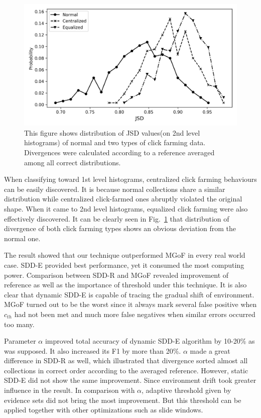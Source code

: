\documentclass{article}
\begin{document}
			\begin{figure}[!t]
				\centering
				\includegraphics[width=\linewidth]{fig/RawOverview2nd.png}
				\caption{This figure shows distribution of JSD values(on 2nd level histograms) of normal and two types of click farming data. Divergences were calculated according to a reference averaged among all correct distributions.}
				\label{fig:raw-overview}
			\end{figure}
	
			When classifying toward 1st level histograms, centralized click farming behaviours can be easily discovered. It is because normal collections share a similar distribution while centralized click-farmed ones abruptly violated the original shape.
			When it came to 2nd level histograms, equalized click farming were also effectively discovered. It can be clearly seen in Fig.~\ref{fig:raw-overview} that distribution of divergence of both click farming types shows an obvious deviation from the normal one.
			
			The result showed that our technique outperformed MGoF in every real world case.
			SDD-E provided best performance, yet it consumed the most computing power. Comparison between SDD-R and MGoF revealed improvement of reference as well as the importance of threshold under this technique. It is also clear that dynamic SDD-E is capable of tracing the gradual shift of environment. MGoF turned out to be the worst since it always mark several false positive when $c_{th}$ had not been met and much more false negatives when similar errors occurred too many. 
			
			Parameter $\alpha$ improved total accuracy of dynamic SDD-E algorithm by 10-20\% as was supposed. It also increased its F1 by more than 20\%. $\alpha$ made a great difference in SDD-R as well, which illustrated that divergence sorted almost all collections in correct order according to the averaged reference. However, static SDD-E did not show the same improvement. Since environment drift took greater influence in the result. In comparison with $\alpha$, adaptive threshold given by evidence sets did not bring the most improvement. But this threshold can be applied together with other optimizations such as slide windows.
	
\end{document}
